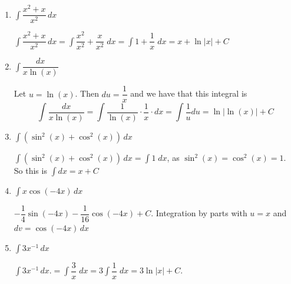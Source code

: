 \documentclass{article}
\begin{document}
\begin{enumerate}
\begin{enumerate}
        \begin{solution}
          $= - \sqrt{1 - x^2} + C$. Use substitution with $u=1-x^2$.
        \end{solution}
        \probonly{\vfill}
        
        \item $\displaystyle \int \dfrac{x^2 + x}{x^2}\,dx$
        
        \begin{solution}
          $\displaystyle \int \dfrac{x^2 + x}{x^2}\,dx = \int \dfrac{x^2}{x^2} + \dfrac{x}{x^2} \; dx = \int 1 + \dfrac{1}{x} \; dx = x + \ln|x| + C$ 
        \end{solution}
        \probonly{\vfill}
        
        \probonly{\newpage}
        
        \item $\displaystyle \int \dfrac{dx}{x\ln(x)}$
        
        \begin{solution}
          Let $u=\ln(x)$. Then $du = \dfrac{1}{x}$ and we have that this integral is 
          $$\displaystyle \int \dfrac{dx}{x\ln(x)} = \int \dfrac{1}{\ln(x)} \cdot \dfrac{1}{x} \cdot dx = \int \dfrac{1}{u} du = \ln|\ln(x)| + C$$
        \end{solution}
        \probonly{\vfill}
        
        \item $\displaystyle \int (\sin^2(x) + \cos^2(x))\,dx$
        
        \begin{solution}
          $\displaystyle \int (\sin^2(x) + \cos^2(x))\,dx = \int 1 \; dx$, as $\sin^2(x) = \cos^2(x) = 1$. So this is $\displaystyle \int dx = x + C$
        \end{solution}
        \probonly{\vfill}
        
        \item $\displaystyle \int x\cos(-4x)\,dx$
        
        \begin{solution}
          $-\dfrac{1}{4}\sin(-4x)-\dfrac{1}{16}\cos(-4x)+C$. Integration by parts with $u=x$ and $dv=\cos (-4x)\,dx$
        \end{solution}
        \probonly{\vfill}
        
        \item $\displaystyle \int 3x^{-1}\,dx$
        
        \begin{solution}
          $\displaystyle \int 3x^{-1}\,dx. = \int \dfrac{3}{x} \; dx = 3 \int \dfrac{1}{x} \; dx = 3 \ln|x| + C.$
        \end{solution}
        \probonly{\vfill}


\end{enumerate}
\end{enumerate}
\end{document}
